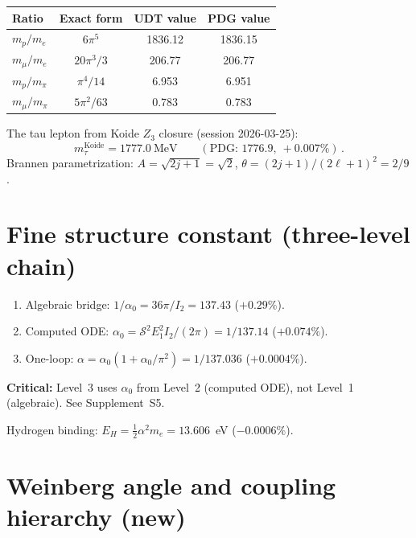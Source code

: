 \documentclass[11pt,letterpaper]{article}
\numberwithin{equation}{section}
\begin{document}
\begin{longtable}{lccc}
\toprule
Ratio & Exact form & UDT value & PDG value \\
\midrule
\endfirsthead
$m_p/m_e$ & $6\pi^5$ & 1836.12 & 1836.15 \\
$m_\mu/m_e$ & $20\pi^3/3$ & 206.77 & 206.77 \\
$m_p/m_\pi$ & $\pi^4/14$ & 6.953 & 6.951 \\
$m_\mu/m_\pi$ & $5\pi^2/63$ & 0.783 & 0.783 \\
\bottomrule
\end{longtable}

The tau lepton from Koide $Z_3$ closure (session 2026-03-25):
\begin{equation}
  m_\tau^{\mathrm{Koide}} = 1777.0~\text{MeV}
  \qquad(\text{PDG: }1776.9,\ +0.007\%)\,.
\end{equation}
Brannen parametrization: $A = \sqrt{2j+1} = \sqrt{2}$,
$\theta = (2j+1)/(2\ell+1)^2 = 2/9$.

\section{Fine structure constant (three-level chain)}
\label{sec:alpha}

\begin{enumerate}
  \item Algebraic bridge: $1/\alpha_0 = 36\pi/I_2 = 137.43$ ($+0.29\%$).
  \item Computed ODE: $\alpha_0 = \mathcal{S}^2 E_1^2 I_2/(2\pi) = 1/137.14$ ($+0.074\%$).
  \item One-loop: $\alpha = \alpha_0(1 + \alpha_0/\pi^2) = 1/137.036$ ($+0.0004\%$).
\end{enumerate}

\noindent\textbf{Critical:} Level~3 uses $\alpha_0$ from Level~2
(computed ODE), not Level~1 (algebraic). See Supplement~S5.

Hydrogen binding: $E_H = \frac{1}{2}\alpha^2 m_e = 13.606$~eV ($-0.0006\%$).

\section{Weinberg angle and coupling hierarchy (new)}
\label{sec:weinberg}
\end{document}
